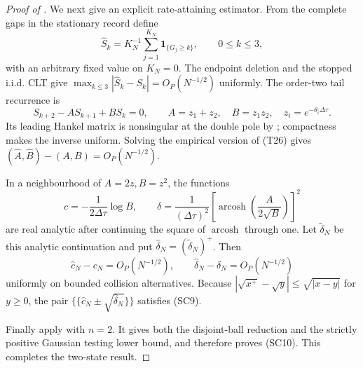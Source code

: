 \begin{proof}[Proof of ]
We next give an explicit rate-attaining estimator.  From the complete gaps in
the stationary record define
\[
 \widehat S_k=K_N^{-1}\sum_{j=1}^{K_N}\mathbf1_{\{G_j\ge k\}},
 \qquad 0\le k\le3,
\tag{T25}
\]
with an arbitrary fixed value on \(K_N=0\).  The endpoint deletion and the
stopped i.i.d. CLT give
\(\max_{k\le3}|\widehat S_k-S_k|=O_P(N^{-1/2})\) uniformly.  The order-two
tail recurrence is
\[
 S_{k+2}-A S_{k+1}+B S_k=0,\qquad
 A=z_1+z_2,\quad B=z_1z_2,\quad z_i=e^{-\theta_i\Delta\tau}.
\tag{T26}
\]
Its leading Hankel matrix is nonsingular at the double pole by
; compactness makes
the inverse uniform.  Solving the empirical version of \textup{(T26)} gives
\((\widehat A,\widehat B)-(A,B)=O_P(N^{-1/2})\).

In a neighbourhood of \(A=2z,B=z^2\), the functions
\[
 c=-\frac1{2\Delta\tau}\log B,\qquad
 \delta=\frac1{(\Delta\tau)^2}
 \left[\operatorname{arcosh}\left(\frac{A}{2\sqrt B}\right)\right]^2
\tag{T27}
\]
are real analytic after continuing the square of \(\operatorname{arcosh}\)
through one.  Let \(\widetilde\delta_N\) be this analytic continuation and
put \(\widehat\delta_N=(\widetilde\delta_N)^+\).  Then
\[
 \widehat c_N-c_N=O_P(N^{-1/2}),\qquad
 \widehat\delta_N-\delta_N=O_P(N^{-1/2})
\tag{T28}
\]
uniformly on bounded collision alternatives.  Because
\(|\sqrt{x^+}-\sqrt{y}|\le\sqrt{|x-y|}\) for \(y\ge0\), the pair
\(\{\!\{\widehat c_N\pm\sqrt{\widehat\delta_N}\}\!\}\) satisfies
\textup{(SC9)}.

Finally apply  with \(n=2\).  It gives
both the disjoint-ball reduction and the strictly positive Gaussian testing
lower bound, and therefore proves \textup{(SC10)}.  This completes the
two-state result.
\end{proof}
